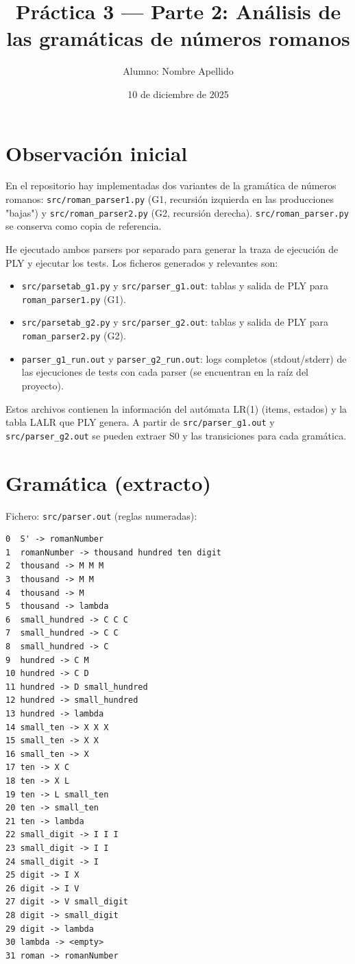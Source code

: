 \documentclass[a4paper,11pt]{article}
\title{Práctica 3 — Parte 2: Análisis de las gramáticas de números romanos}
\author{Alumno: Nombre Apellido}
\date{10 de diciembre de 2025}
\begin{document}
\maketitle

\section*{Observación inicial}
En el repositorio hay implementadas dos variantes de la gramática de números romanos: \texttt{src/roman\_parser1.py} (G1, recursión izquierda en las producciones "bajas") y \texttt{src/roman\_parser2.py} (G2, recursión derecha). \texttt{src/roman\_parser.py} se conserva como copia de referencia.

He ejecutado ambos parsers por separado para generar la traza de ejecución de PLY y ejecutar los tests. Los ficheros generados y relevantes son:

\begin{itemize}
\item \texttt{src/parsetab\_g1.py} y \texttt{src/parser\_g1.out}: tablas y salida de PLY para \texttt{roman\_parser1.py} (G1).
\item \texttt{src/parsetab\_g2.py} y \texttt{src/parser\_g2.out}: tablas y salida de PLY para \texttt{roman\_parser2.py} (G2).
\item \texttt{parser\_g1\_run.out} y \texttt{parser\_g2\_run.out}: logs completos (stdout/stderr) de las ejecuciones de tests con cada parser (se encuentran en la raíz del proyecto).
\end{itemize}

Estos archivos contienen la información del autómata LR(1) (items, estados) y la tabla LALR que PLY genera. A partir de \texttt{src/parser\_g1.out} y \texttt{src/parser\_g2.out} se pueden extraer S0 y las transiciones para cada gramática.

\section*{Gramática (extracto)}
Fichero: \texttt{src/parser.out} (reglas numeradas):
\begin{verbatim}
0  S' -> romanNumber
1  romanNumber -> thousand hundred ten digit
2  thousand -> M M M
3  thousand -> M M
4  thousand -> M
5  thousand -> lambda
6  small_hundred -> C C C
7  small_hundred -> C C
8  small_hundred -> C
9  hundred -> C M
10 hundred -> C D
11 hundred -> D small_hundred
12 hundred -> small_hundred
13 hundred -> lambda
14 small_ten -> X X X
15 small_ten -> X X
16 small_ten -> X
17 ten -> X C
18 ten -> X L
19 ten -> L small_ten
20 ten -> small_ten
21 ten -> lambda
22 small_digit -> I I I
23 small_digit -> I I
24 small_digit -> I
25 digit -> I X
26 digit -> I V
27 digit -> V small_digit
28 digit -> small_digit
29 digit -> lambda
30 lambda -> <empty>
31 roman -> romanNumber
\end{verbatim}
\end{document}
